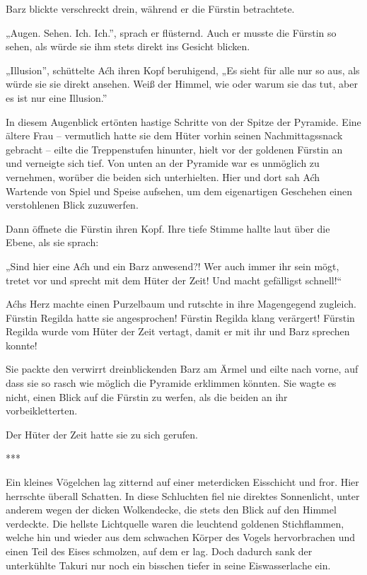 Barz blickte verschreckt drein, während er die Fürstin betrachtete.

„Augen. Sehen. Ich. Ich.”, sprach er flüsternd. Auch er musste die Fürstin so sehen, als würde sie ihm stets direkt ins Gesicht blicken.

„Illusion”, schüttelte Aćh ihren Kopf beruhigend, „Es sieht für alle nur so aus, als würde sie sie direkt ansehen. Weiß der Himmel, wie oder warum sie das tut, aber es ist nur eine Illusion.”

In diesem Augenblick ertönten hastige Schritte von der Spitze der Pyramide. Eine ältere Frau – vermutlich hatte sie dem Hüter vorhin seinen Nachmittagssnack gebracht – eilte die Treppenstufen hinunter, hielt vor der goldenen Fürstin an und verneigte sich tief. Von unten an der Pyramide war es unmöglich zu vernehmen, worüber die beiden sich unterhielten. Hier und dort sah Aćh Wartende von Spiel und Speise aufsehen, um dem eigenartigen Geschehen einen verstohlenen Blick zuzuwerfen.

Dann öffnete die Fürstin ihren Kopf. Ihre tiefe Stimme hallte laut über die Ebene, als sie sprach:

„Sind hier eine Aćh und ein Barz anwesend?! Wer auch immer ihr sein mögt, tretet vor und sprecht mit dem Hüter der Zeit! Und macht gefälligst schnell!“

Aćhs Herz machte einen Purzelbaum und rutschte in ihre Magengegend zugleich. Fürstin Regilda hatte sie angesprochen! Fürstin Regilda klang verärgert! Fürstin Regilda wurde vom Hüter der Zeit vertagt, damit er mit ihr und Barz sprechen konnte!

Sie packte den verwirrt dreinblickenden Barz am Ärmel und eilte nach vorne, auf dass sie so rasch wie möglich die Pyramide erklimmen könnten. Sie wagte es nicht, einen Blick auf die Fürstin zu werfen, als die beiden an ihr vorbeikletterten.

Der Hüter der Zeit hatte sie zu sich gerufen.\bigskip

***\bigskip

Ein kleines Vögelchen lag zitternd auf einer meterdicken Eisschicht und fror. Hier herrschte überall Schatten. In diese Schluchten fiel nie direktes Sonnenlicht, unter anderem wegen der dicken Wolkendecke, die stets den Blick auf den Himmel verdeckte. Die hellste Lichtquelle waren die leuchtend goldenen Stichflammen, welche hin und wieder aus dem schwachen Körper des Vogels hervorbrachen und einen Teil des Eises schmolzen, auf dem er lag. Doch dadurch sank der unterkühlte Takuri nur noch ein bisschen tiefer in seine Eiswasserlache ein.

